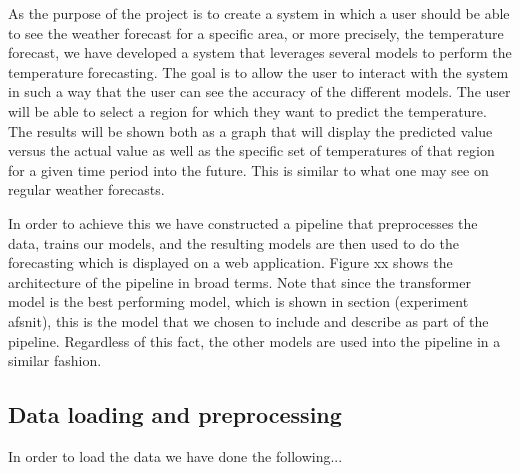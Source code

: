 As the purpose of the project is to create a system in which a user should be able to see the weather forecast for a specific area, or more precisely, the temperature forecast, we have developed a system that leverages several models to perform the temperature forecasting. 
The goal is to allow the user to interact with the system in such a way that the user can see the accuracy of the different models. 
The user will be able to select a region for which they want to predict the temperature. The results will be shown both as a graph that will display the predicted value versus the actual value as well as the specific set of temperatures of that region for a given time period into the future. This is similar to what one may see on regular weather forecasts.

In order to achieve this we have constructed a pipeline that preprocesses the data, trains our models, and the resulting models are then used to do the forecasting which is displayed on a web application. 
Figure xx shows the architecture of the pipeline in broad terms. 
Note that since the transformer model is the best performing model, which is shown in section (experiment afsnit), this is the model that we chosen to include and describe as part of the pipeline. Regardless of this fact, the other models are used into the pipeline in a similar fashion.

\subsection{Data loading and preprocessing}
In order to load the data we have done the following...